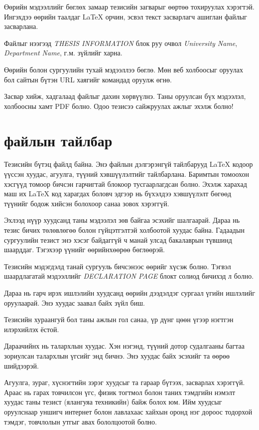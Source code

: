 Өөрийн мэдээллийг бөглөх замаар тезисийн загварыг өөртөө тохируулах хэрэгтэй. Ингэхдээ өөрийн таалдаг \LaTeX{} орчин, эсвэл текст засварлагч ашиглан  файлыг засварлана.

Файлыг нээгээд \emph{THESIS INFORMATION} блок руу очвол \emph{University Name}, \emph{Department Name}, г.м. зүйлийг харна.

Өөрийн болон сургуулийн тухай мэдээллээ бөглө. Мөн веб холбоосыг оруулах бол сайтын бүтэн URL хаягийг  командад оруулж өгнө.

Засвар хийж, хадгалаад  файлыг дахин хөрвүүлнэ. Таны оруулсан бүх мэдээлэл, холбоосны хамт PDF болно. Одоо тезисээ сайжруулах ажлыг эхэлж болно!


\section{ файлын тайлбар}

Тезисийн бүтэц  файлд байна. Энэ файлын дэлгэрэнгүй тайлбарууд \LaTeX{} кодоор үүссэн хуудас, агуулга, түүний хэвшүүлэлтийг тайлбарлана. Баримтын томоохон хэсгүүд томоор бичсэн гарчигтай блокоор тусгаарлагдсан болно. Эхэлж харахад маш их \LaTeX{} код харагдах боловч эдгээр нь бүхэлдээ хэвшүүлэлт бөгөөд түүнийг бодож хийсэн болохоор санаа зовох хэрэггүй. 

Эхлээд нүүр хуудсанд таны мэдээлэл зөв байгаа эсэхийг шалгаарай. Дараа нь тезис бичих төлөвлөгөө болон гүйцэтгэлтэй холбоотой хуудас байна. Гадаадын сургуулийн тезист энэ хэсэг байдаггүй ч манай улсад бакалаврын түвшинд шаарддаг. Тэгэхээр үүнийг өөрийнхөөрөө бөглөөрэй.

Тезисийн мэдэгдэлд танай сургууль бичсэнээс өөрийг хүсэж болно. Тэгвэл шаардлагатай мэдээллийг \emph{DECLARATION PAGE} блокт солиод бичихэд л болно.

Дараа нь гарч ирэх ишлэлийн хуудсанд өөрийн дээдэлдэг сургаал үгийн ишлэлийг оруулаарай. Энэ хуудас заавал байх зүйл биш.

Тезисийн хураангуй бол таны ажлын гол санаа, үр дүнг цөөн үгээр нэгтгэн илэрхийлэх ёстой.

Дараачийнх нь талархлын хуудас. Хэн нэгэнд, түүний дотор судалгааны багтаа зориулсан талархлын үгсийг энд бичнэ. Энэ хуудас байх эсэхийг та өөрөө шийдээрэй.

Агуулга, зураг, хүснэгтийн зэрэг хуудсыг та гараар бүтээх, засварлах хэрэггүй. Араас нь гарах товчилсон үгс, физик тогтмол болон таних тэмдгийн нэмэлт хуудас таны тезист (ялангуяа техникийн) байж болох юм. Ийм хуудсыг оруулснаар уншигч интернет болон лавлахаас хайхын оронд нэг дороос тодорхой тэмдэг, товчлолын утгыг авах бололцоотой болно.

